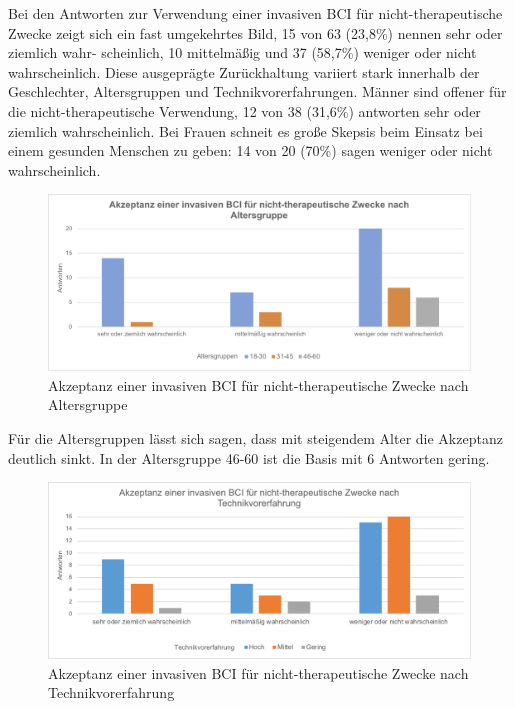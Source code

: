 \documentclass[11pt,ngerman,parskip=half]{scrartcl}
\begin{document}
Bei den Antworten zur Verwendung einer invasiven BCI für nicht-therapeutische
Zwecke zeigt sich ein fast umgekehrtes Bild, 15 von 63 (23,8\%) nennen sehr
oder ziemlich wahr- scheinlich, 10 mittelmäßig und 37 (58,7\%) weniger oder
nicht wahrscheinlich. Diese ausgeprägte Zurückhaltung variiert stark
innerhalb der Geschlechter, Altersgruppen und Technikvorerfahrungen. Männer
sind offener für die nicht-therapeutische Verwendung, 12 von 38 (31,6\%)
antworten sehr oder ziemlich wahrscheinlich. Bei Frauen schneit es große
Skepsis beim Einsatz bei einem gesunden Menschen zu geben: 14 von 20 (70\%)
sagen weniger oder nicht wahrscheinlich.

\begin{figure}[H]
  \centering
  \includegraphics[width=1.0\textwidth]{src/img/kathrin4.png}
  \caption{Akzeptanz einer invasiven BCI für nicht-therapeutische Zwecke nach
  Altersgruppe}
  \label{img:kathrin4}
\end{figure}

Für die Altersgruppen lässt sich sagen, dass mit steigendem Alter die
Akzeptanz deutlich sinkt. In der Altersgruppe 46-60 ist die Basis mit 6
Antworten gering.

\begin{figure}[H]
  \centering
  \includegraphics[width=1.0\textwidth]{src/img/kathrin5.png}
  \caption{Akzeptanz einer invasiven BCI für nicht-therapeutische Zwecke nach
  Technikvorerfahrung}
  \label{img:kathrin5}
\end{figure}
\end{document}
